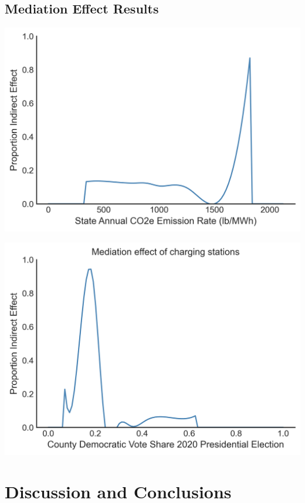 \documentclass[
  letterpaper,
  DIV=11,
  numbers=noendperiod]{scrartcl}
\begin{document}
\hypertarget{mediation-effect-results}{%
\subsection{Mediation Effect Results}\label{mediation-effect-results}}

\includegraphics{TRB_2023_files/figure-pdf/cell-25-output-1.png}

\includegraphics{TRB_2023_files/figure-pdf/cell-28-output-1.png}

\hypertarget{discussion-and-conclusions}{%
\section{Discussion and Conclusions}\label{discussion-and-conclusions}}
\end{document}
